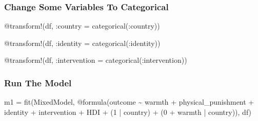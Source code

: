 \documentclass[
  letterpaper,
  DIV=11,
  numbers=noendperiod]{scrreprt}
\newenvironment{Shaded}{\begin{snugshade}}{\end{snugshade}}
\newcommand{\FloatTok}[1]{\textcolor[rgb]{0.68,0.00,0.00}{#1}}
\newcommand{\FunctionTok}[1]{\textcolor[rgb]{0.28,0.35,0.67}{#1}}
\newcommand{\NormalTok}[1]{\textcolor[rgb]{0.00,0.23,0.31}{#1}}
\newcommand{\OperatorTok}[1]{\textcolor[rgb]{0.37,0.37,0.37}{#1}}
\newcommand{\PreprocessorTok}[1]{\textcolor[rgb]{0.68,0.00,0.00}{#1}}
\begin{document}
\subsubsection{Change Some Variables To
Categorical}\label{change-some-variables-to-categorical-1}

\begin{Shaded}
\begin{Highlighting}[]
\PreprocessorTok{@transform}\NormalTok{!(df, }\OperatorTok{:}\NormalTok{country }\OperatorTok{=} \FunctionTok{categorical}\NormalTok{(}\OperatorTok{:}\NormalTok{country))}

\PreprocessorTok{@transform}\NormalTok{!(df, }\OperatorTok{:}\NormalTok{identity }\OperatorTok{=} \FunctionTok{categorical}\NormalTok{(}\OperatorTok{:}\NormalTok{identity))}

\PreprocessorTok{@transform}\NormalTok{!(df, }\OperatorTok{:}\NormalTok{intervention }\OperatorTok{=} \FunctionTok{categorical}\NormalTok{(}\OperatorTok{:}\NormalTok{intervention))}
\end{Highlighting}
\end{Shaded}

\subsubsection{Run The Model}\label{run-the-model-2}

\begin{Shaded}
\begin{Highlighting}[]

\NormalTok{m1 }\OperatorTok{=} \FunctionTok{fit}\NormalTok{(MixedModel, }\PreprocessorTok{@formula}\NormalTok{(outcome }\OperatorTok{\textasciitilde{}}\NormalTok{ warmth }\OperatorTok{+}\NormalTok{ physical\_punishment }\OperatorTok{+} 
\NormalTok{               identity }\OperatorTok{+}\NormalTok{ intervention }\OperatorTok{+}\NormalTok{ HDI }\OperatorTok{+}
\NormalTok{               (}\FloatTok{1} \OperatorTok{|}\NormalTok{ country) }\OperatorTok{+}
\NormalTok{               (}\FloatTok{0} \OperatorTok{+}\NormalTok{ warmth }\OperatorTok{|}\NormalTok{ country)), df)}
\end{Highlighting}
\end{Shaded}
\end{document}
